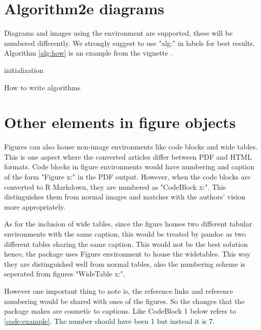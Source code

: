 \section{Algorithm2e diagrams}

Diagrams and images using the  environment are supported, these will be numbered differently.
We strongly suggest to use "alg:" in labels for best results. 
Algorithm \ref{alg:how} is an example from the  vignette \cite{algoexample}.


\begin{algorithm}[htbp]
\SetAlgoLined
{}
initialization\;
\caption{How to write algorithms}
  \label{alg:how}
\end{algorithm}

\section{Other elements in figure objects}

Figures can also house non-image environments like code blocks and wide tables. This is 
one aspect where the converted articles differ between PDF and HTML formats. Code blocks 
in figure environments would have numbering and caption of the form "Figure x:" in the PDF output. However, 
when the code blocks are converted to R Markdown, they are numbered as "CodeBlock x:".
This distinguishes them from normal images and matches with the authors' vision more appropriately. 

As for the inclusion of wide tables, since the figure houses two different tabular environments with the same caption,
this would be treated by pandoc as two different tables sharing the same caption. This would not be the best solution hence, the  package uses Figure environment to house the widetables.
This way they are distinguished well from normal tables, also the numbering scheme is seperated from figures "WideTable x:".

However one important thing to note is, the reference links and reference numbering would be shared with ones of the figures. So the changes that the package makes are cosmetic to captions. Like CodeBlock 1 below refers to \ref{code:example}. The number should have been 1 but instead it is 7.

